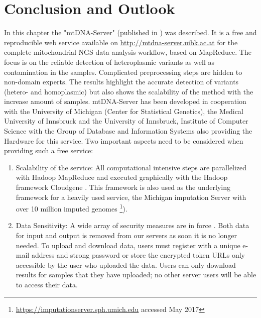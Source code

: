 \section{Conclusion and Outlook}
In this chapter the "mtDNA-Server" (published in \cite{Weissensteiner2016b}) was described. It is a free and reproducible web service available on \url{http://mtdna-server.uibk.ac.at} for the complete mitochondrial NGS data analysis workflow, based on MapReduce. The focus is on the reliable detection of heteroplasmic variants as well as contamination in the samples. Complicated preprocessing steps are hidden to non-domain experts. The results highlight the accurate detection of variants (hetero- and homoplasmic) but also shows the scalability of the method with the increase amount of samples. mtDNA-Server has been developed in cooperation with the University of Michigan (Center for Statistical Genetics), the Medical University of Innsbruck and the University of Innsbruck, Institute of Computer Science with the Group of Database and Information Systems also providing the Hardware for this service.
Two important aspects need to be considered when providing such a free service:
\begin{enumerate}
\item Scalability of the service: All computational intensive steps are parallelized with Hadoop MapReduce and executed graphically with the Hadoop framework Cloudgene \cite{Schonherr2012, Weissensteiner2016b}. This framework is also used as the underlying framework for a heavily used service, the Michigan imputation Server \cite{Das2016} with over 10 million imputed genomes \footnote{\url{https://imputationserver.sph.umich.edu} accessed May 2017}).
\item Data Sensitivity: A wide array of security measures are in force \cite{Weissensteiner2016a}. Both data for input and output is removed from our servers as soon it is no longer needed. To upload and download data, users must register with a unique e-mail address and strong password or store the encrypted token URLs only accessible by the user who uploaded the data. Users can only download results for samples that they have uploaded; no other server users will be able to access their data.
\end{enumerate}

